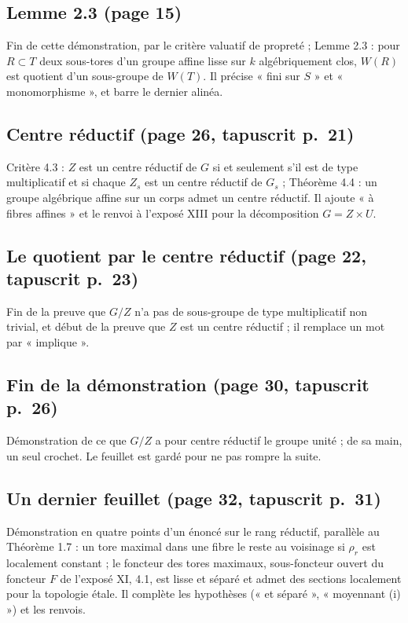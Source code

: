 \documentclass[11pt,a4paper]{article}
\begin{document}
\subsection*{Lemme 2.3 (page 15)}

Fin de cette démonstration, par le critère valuatif de
propreté ; Lemme 2.3 : pour $R \subset T$ deux sous-tores d'un groupe
affine lisse sur $k$ algébriquement clos, $W(R)$ est quotient d'un
sous-groupe de $W(T)$. Il précise « fini sur $S$ » et
« monomorphisme », et barre le dernier alinéa.

\subsection*{Centre réductif (page 26, tapuscrit p.~21)}

Critère 4.3 : $Z$ est un centre réductif de $G$ si et
seulement s'il est de type multiplicatif et si chaque $Z_{s}$ est un centre
réductif de $G_{s}$ ; Théorème 4.4 : un groupe algébrique affine sur un
corps admet un centre réductif. Il ajoute « à fibres affines » et le
renvoi à l'exposé XIII pour la décomposition $G = Z \times U$.

\subsection*{Le quotient par le centre réductif (page 22, tapuscrit p.~23)}

Fin de la preuve que $G/Z$ n'a pas de sous-groupe de type
multiplicatif non trivial, et début de la preuve que $Z$ est un centre
réductif ; il remplace un mot par « implique ».

\subsection*{Fin de la démonstration (page 30, tapuscrit p.~26)}

Démonstration de ce que $G/Z$ a pour centre réductif le
groupe unité ; de sa main, un seul crochet. Le feuillet est gardé pour ne
pas rompre la suite.

\subsection*{Un dernier feuillet (page 32, tapuscrit p.~31)}

Démonstration en quatre points d'un énoncé sur le rang réductif, parallèle
au Théorème 1.7 : un tore maximal dans une fibre le reste au voisinage si
$\rho_{r}$ est localement constant ; le foncteur des tores maximaux,
sous-foncteur ouvert du foncteur $F$ de l'exposé XI, 4.1, est lisse et
séparé et admet des sections localement pour la topologie étale. Il
complète les hypothèses (« et séparé », « moyennant (i) ») et les
renvois.
\end{document}
